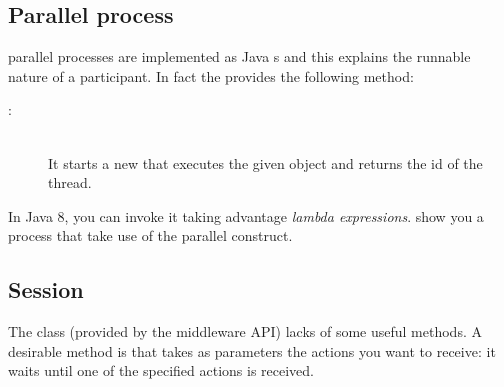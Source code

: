 \subsection{Parallel process}
\coco parallel processes are implemented as Java s and this explains the runnable nature of a participant. In fact the  provides the following method:
%
\begin{description}
	\item[ : ] \hfill \\
	It starts a new  that executes the given  object and returns the id of the thread.
\end{description}
%



In Java 8, you can invoke it taking advantage \textit{lambda expressions}.  show you a process that take use of the parallel construct.


\subsection{Session}

The class  %
(provided by the middleware API) lacks of some useful methods. A desirable method is  that takes as parameters the actions you want to receive: it waits until one of the specified actions is received.

